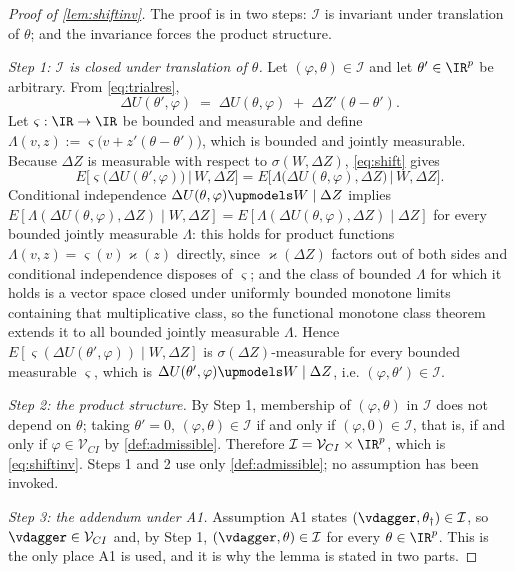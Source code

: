 \begin{proof}[Proof of \cref{lem:shiftinv}]
The proof is in two steps: $\mathcal I$ is invariant under translation of $\theta$; and the invariance
forces the product structure.

\emph{Step 1: $\mathcal I$ is closed under translation of $\theta$.}
Let $(\varphi,\theta)\in\mathcal I$ and let $\theta'\in\IR^{p}$ be arbitrary. From \eqref{eq:trialres},
\begin{equation}\label{eq:shift}
\Delta U(\theta',\varphi)\;=\;\Delta U(\theta,\varphi)\;+\;\Delta Z'(\theta-\theta').
\end{equation}
Let $\varsigma:\IR\to\IR$ be bounded and measurable and define
$\Lambda(v,z):=\varsigma\big(v+z'(\theta-\theta')\big)$, which is bounded and jointly measurable. Because
$\Delta Z$ is measurable with respect to $\sigma(W,\Delta Z)$, \eqref{eq:shift} gives
\[
E\big[\varsigma\big(\Delta U(\theta',\varphi)\big)\,\big|\,W,\Delta Z\big]
=E\big[\Lambda\big(\Delta U(\theta,\varphi),\Delta Z\big)\,\big|\,W,\Delta Z\big].
\]
Conditional independence $\Delta U(\theta,\varphi)\upmodels W\mid\Delta Z$ implies
$E[\Lambda(\Delta U(\theta,\varphi),\Delta Z)\mid W,\Delta Z]=E[\Lambda(\Delta U(\theta,\varphi),\Delta Z)\mid\Delta Z]$
for every bounded jointly measurable $\Lambda$: this holds for product functions
$\Lambda(v,z)=\varsigma(v)\varkappa(z)$ directly, since $\varkappa(\Delta Z)$ factors out of both sides
and conditional independence disposes of $\varsigma$; and the class of bounded $\Lambda$ for which it
holds is a
vector space closed under uniformly bounded monotone limits containing that multiplicative class, so the
functional monotone class theorem extends it to all bounded jointly measurable $\Lambda$. Hence
$E[\varsigma(\Delta U(\theta',\varphi))\mid W,\Delta Z]$ is $\sigma(\Delta Z)$-measurable for every
bounded measurable $\varsigma$, which is $\Delta U(\theta',\varphi)\upmodels W\mid\Delta Z$, i.e.
$(\varphi,\theta')\in\mathcal I$.

\emph{Step 2: the product structure.}
By Step 1, membership of $(\varphi,\theta)$ in $\mathcal I$ does not depend on $\theta$; taking
$\theta'=0$, $(\varphi,\theta)\in\mathcal I$ if and only if $(\varphi,0)\in\mathcal I$, that is, if and
only if $\varphi\in\mathcal V_{CI}$ by \cref{def:admissible}. Therefore
$\mathcal I=\mathcal V_{CI}\times\IR^{p}$, which is \eqref{eq:shiftinv}. Steps 1 and 2 use only
\cref{def:admissible}; no assumption has been invoked.

\emph{Step 3: the addendum under A1.}
Assumption A1 states $(\vdagger,\theta_\dagger)\in\mathcal I$, so $\vdagger\in\mathcal V_{CI}$ and, by
Step 1, $(\vdagger,\theta)\in\mathcal I$ for every $\theta\in\IR^{p}$. This is the only place A1 is used,
and it is why the lemma is stated in two parts.
\end{proof}

